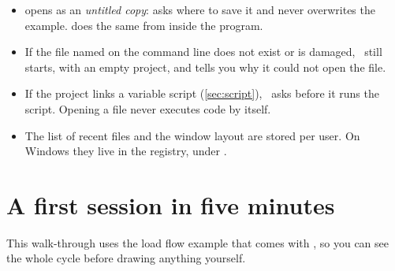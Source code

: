 \begin{itemize}
  \item {} opens  as an \emph{untitled copy}:
     asks where to save it and never overwrites the example.
     does the same from inside the program.
  \item If the file named on the command line does not exist or is damaged, \app\ still
    starts, with an empty project, and tells you why it could not open the file.
  \item If the project links a variable script (\cref{sec:script}), \app\ asks before it
    runs the script. Opening a file never executes code by itself.
  \item The list of recent files and the window layout are stored per user. On Windows
    they live in the registry, under .
\end{itemize}

\section{A first session in five minutes}\label{sec:first-session}

This walk-through uses the load flow example that comes with \app, so you can see the
whole cycle before drawing anything yourself.

